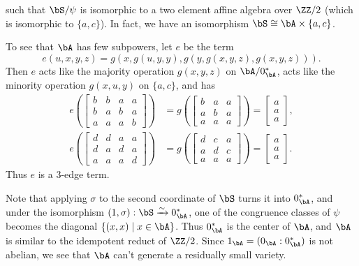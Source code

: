 \begin{ex}
\[\]
such that $\bS/\psi$ is isomorphic to a two element affine algebra over $\ZZ/2$ (which is isomorphic to $\{a,c\}$). In fact, we have an isomorphism $\bS \cong \bA\times \{a,c\}$.

To see that $\bA$ has few subpowers, let $e$ be the term
\[
e(u,x,y,z) = g(x,g(u,y,y),g(y,g(x,y,z),g(x,y,z))).
\]
Then $e$ acts like the majority operation $g(x,y,z)$ on $\bA/0^*_\bA$, acts like the minority operation $g(x,u,y)$ on $\{a,c\}$, and has
\begin{align*}
e\left(\begin{bmatrix} b & b & a & a\\ b & a & b & a\\ a & a & a & b\end{bmatrix}\right) &= g\left(\begin{bmatrix} b & a & a\\ a & b & a\\ a & a & a\end{bmatrix}\right) = \begin{bmatrix} a\\ a\\ a\end{bmatrix},\\
e\left(\begin{bmatrix} d & d & a & a\\ d & a & d & a\\ a & a & a & d\end{bmatrix}\right) &= g\left(\begin{bmatrix} d & c & a\\ a & d & c\\ a & a & a\end{bmatrix}\right) = \begin{bmatrix} a\\ a\\ a\end{bmatrix}.
\end{align*}
Thus $e$ is a $3$-edge term.

Note that applying $\sigma$ to the second coordinate of $\bS$ turns it into $0^*_\bA$, and under the isomorphism $(1,\sigma) : \bS \xrightarrow{\sim} 0^*_\bA$, one of the congruence classes of $\psi$ becomes the diagonal $\{(x,x) \mid x \in \bA\}$. Thus $0^*_\bA$ is the center of $\bA$, and $\bA$ is similar to the idempotent reduct of $\ZZ/2$. Since $1_\bA = (0_\bA : 0^*_\bA)$ is not abelian, we see that $\bA$ can't generate a residually small variety.


\end{ex}
